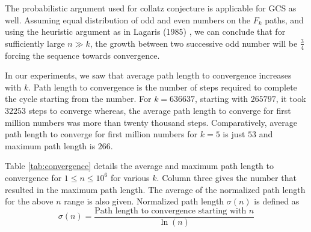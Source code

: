 \documentclass[12pt]{article} %
\begin{document}
The probabilistic argument used for collatz conjecture  is applicable for GCS as well. Assuming equal distribution of odd and even numbers on the $F_k$ paths, and using the heuristic argument as in Lagaris (1985) \cite{lagaris85}, we can conclude that for sufficiently large $n\gg k$, the growth between two successive odd number will be $\frac{3}{4}$ forcing the sequence towards convergence. 

In our experiments, we saw that average path length to convergence increases with $k$. Path length to convergence is the number of steps required to complete the cycle starting from the number. For $k=636637$, starting with $265797$, it took $32253$ steps to converge whereas, the average path length to converge for first million numbers was more than twenty thousand steps. Comparatively, average path length to converge for first million numbers for $k=5$ is just $53$ and maximum path length is $266$.

Table \ref{tab:convergence} details the average and maximum path length to convergence for $1 \leq n \leq 10^6$ for various $k$. Column three gives the number that resulted in the maximum path length. The average of the normalized path length for the above $n$ range is also given. Normalized path length $\sigma(n)$ is defined as 
\[\sigma(n) = \frac{\text{Path length to convergence starting with } n}{\ln(n)}\] 
\end{document}
